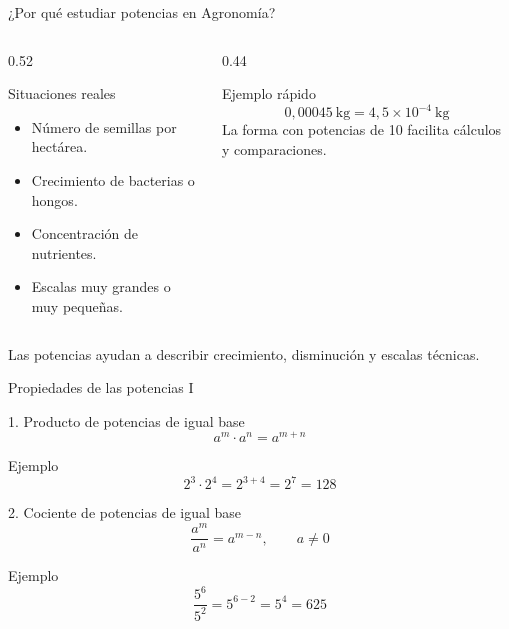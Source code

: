 \documentclass[aspectratio=169,10pt,handout]{beamer}
\newcommand{\pp}{\pause}
\begin{document}
	\begin{frame}{¿Por qué estudiar potencias en Agronomía?}
		\begin{columns}[T,totalwidth=\textwidth]
			\begin{column}{0.52\textwidth}
				\begin{block}{Situaciones reales}
					\begin{itemize}
						\item Número de semillas por hectárea.
						\item Crecimiento de bacterias o hongos.
						\item Concentración de nutrientes.
						\item Escalas muy grandes o muy pequeñas.
					\end{itemize}
				\end{block}
			\end{column}
			
			\begin{column}{0.44\textwidth}
				\begin{exampleblock}{Ejemplo rápido}
					\[
					0{,}00045\ \text{kg}=4{,}5\times10^{-4}\ \text{kg}
					\]
					La forma con potencias de 10 facilita cálculos y comparaciones.
				\end{exampleblock}
			\end{column}
		\end{columns}
		
		\vspace{0.2cm}
		\centering
		{\small \textcolor{WarmGray}{Las potencias ayudan a describir crecimiento, disminución y escalas técnicas.}}
	\end{frame}
	
	\begin{frame}{Propiedades de las potencias I}
		\begin{block}{1. Producto de potencias de igual base}
			\[
			a^m\cdot a^n = a^{m+n}
			\]
		\end{block}
		
		\begin{exampleblock}{Ejemplo}
			\[
			2^3\cdot2^4 = 2^{3+4}=2^7=128
			\]
		\end{exampleblock}
		
		\pp
		
		\begin{block}{2. Cociente de potencias de igual base}
			\[
			\frac{a^m}{a^n}=a^{m-n}, \qquad a\neq 0
			\]
		\end{block}
		
		\begin{exampleblock}{Ejemplo}
			\[
			\frac{5^6}{5^2}=5^{6-2}=5^4=625
			\]
		\end{exampleblock}
	\end{frame}
	
\end{document}
